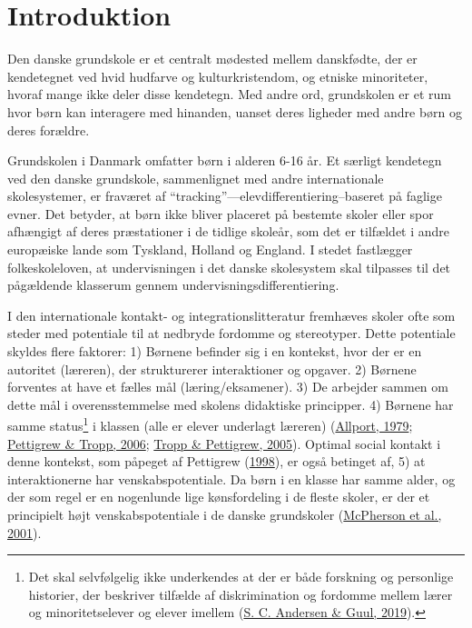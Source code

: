 \documentclass[
]{book}
\begin{document}
\hypertarget{introduktion}{%
\section{Introduktion}\label{introduktion}}

Den danske grundskole er et centralt mødested mellem danskfødte, der er kendetegnet ved hvid hudfarve og kulturkristendom, og etniske minoriteter, hvoraf mange ikke deler disse kendetegn. Med andre ord, grundskolen er et rum hvor børn kan interagere med hinanden, uanset deres ligheder med andre børn og deres forældre.

Grundskolen i Danmark omfatter børn i alderen 6-16 år. Et særligt kendetegn ved den danske grundskole, sammenlignet med andre internationale skolesystemer, er fraværet af ``tracking''---elevdifferentiering--baseret på faglige evner. Det betyder, at børn ikke bliver placeret på bestemte skoler eller spor afhængigt af deres præstationer i de tidlige skoleår, som det er tilfældet i andre europæiske lande som Tyskland, Holland og England. I stedet fastlægger folkeskoleloven, at undervisningen i det danske skolesystem skal tilpasses til det pågældende klasserum gennem undervisningsdifferentiering.

I den internationale kontakt- og integrationslitteratur fremhæves skoler ofte som steder med potentiale til at nedbryde fordomme og stereotyper. Dette potentiale skyldes flere faktorer: 1) Børnene befinder sig i en kontekst, hvor der er en autoritet (læreren), der strukturerer interaktioner og opgaver. 2) Børnene forventes at have et fælles mål (læring/eksamener). 3) De arbejder sammen om dette mål i overensstemmelse med skolens didaktiske principper. 4) Børnene har samme status\footnote{Det skal selvfølgelig ikke underkendes at der er både forskning og personlige historier, der beskriver tilfælde af diskrimination og fordomme mellem lærer og minoritetselever og elever imellem (\protect\hyperlink{ref-andersen2019}{S. C. Andersen \& Guul, 2019}).} i klassen (alle er elever underlagt læreren) (\protect\hyperlink{ref-allport1979}{Allport, 1979}; \protect\hyperlink{ref-pettigrew2006}{Pettigrew \& Tropp, 2006}; \protect\hyperlink{ref-tropp2005}{Tropp \& Pettigrew, 2005}). Optimal social kontakt i denne kontekst, som påpeget af Pettigrew (\protect\hyperlink{ref-pettigrew1998}{1998}), er også betinget af, 5) at interaktionerne har venskabspotentiale. Da børn i en klasse har samme alder, og der som regel er en nogenlunde lige kønsfordeling i de fleste skoler, er der et principielt højt venskabspotentiale i de danske grundskoler (\protect\hyperlink{ref-mcpherson2001}{McPherson et al., 2001}).
\end{document}
